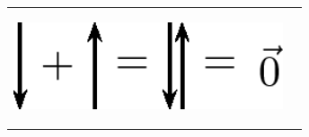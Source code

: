     
    \setlength\mytablespace{4\tabcolsep}
    \addtolength\mytablespace{3\arrayrulewidth}
    \setlength\mytablewidth{\linewidth}
        
    
    \setlength\mytableroom{\mytablewidth}
    \addtolength\mytableroom{-\mytablespace}
    
    \setlength\myfixedwidth{0pt}
    \setlength\mystarwidth{\mytableroom}
        \addtolength\mystarwidth{-\myfixedwidth}
        \divide{}
        
    
            
    
        \begin{center}
      
      \label{m38813*id188668}
      
    \noindent
      \tablelasttail{}
      \begin{xtabular*}{\mytablewidth}[t]{|p{10\mystarwidth}|p{10\mystarwidth}|}\hline
    
    
        
                  
    \setcounter{subfigure}{0}

\label{m38813*id188676}
    \begin{center}
    \label{m38813*id188676!!!underscore!!!media}\label{m38813*id188676!!!underscore!!!printimage}\includegraphics[width=300px]{col11305.imgs/m38813_PG11C1_020.png} %
        
      \vspace{2pt}
    \vspace{.1in}
    
    \end{center}




\end{xtabular*}
\end{center}
